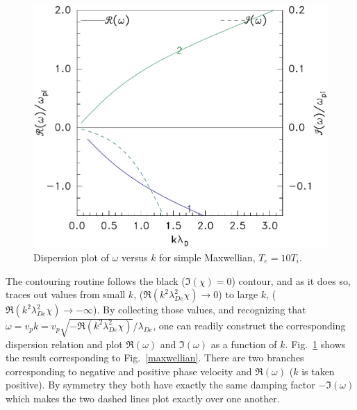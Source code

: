 \documentclass[12pt]{article}
\begin{document}
\begin{figure}[htp]
  \centering
  \includegraphics[width=.5\hsize]{maxwelok}
  \caption{Dispersion plot of $\omega$ versus $k$ for simple
    Maxwellian, $T_e=10 T_i$.}
  \label{fig:maxwelok}
\end{figure}
The contouring routine follows the black ($\Im(\chi)=0$) contour, and
as it does so, traces out values from small $k$,
($\Re(k^2\lambda_{De}^2\chi)\to 0$) to large $k$,
($\Re(k^2\lambda_{De}^2\chi)\to-\infty$). By collecting those values,
and recognizing that
$\omega=v_pk=v_p\sqrt{-\Re(k^2\lambda_{De}^2\chi)}/\lambda_{De}$, one
can readily construct the corresponding dispersion relation and plot
$\Re(\omega)$ and $\Im(\omega)$ as a function of $k$. Fig.\
\ref{fig:maxwelok} shows the result corresponding to Fig.\
\ref{maxwellian}. There are two branches corresponding to negative and
positive phase velocity and $\Re(\omega)$ ($k$ is taken positive). By
symmetry they both have exactly the same damping factor $-\Im(\omega)$
which makes the two dashed lines plot exactly over one another.
\end{document}
